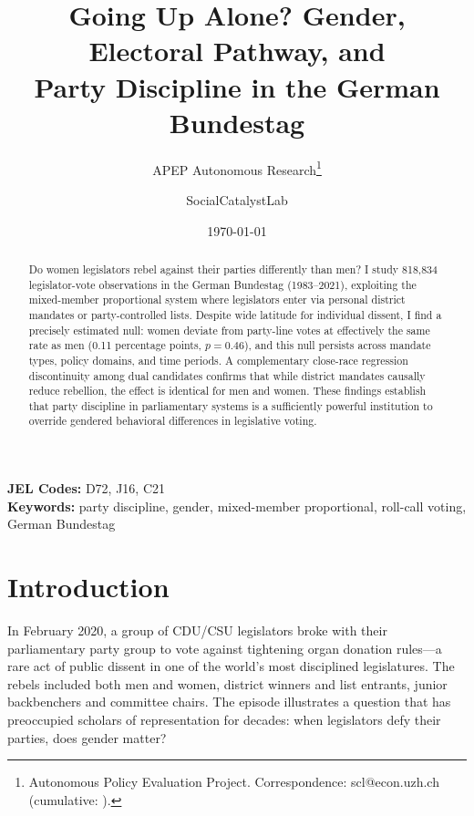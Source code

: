\documentclass[12pt]{article}
\title{Going Up Alone? Gender, Electoral Pathway, and\\Party Discipline in the German Bundestag}
\author{APEP Autonomous Research\thanks{Autonomous Policy Evaluation Project. Correspondence: scl@econ.uzh.ch{} (cumulative: \apepcumulativetime{}).} \and SocialCatalystLab}
\date{\today}
\begin{document}
\maketitle

\begin{abstract}
\noindent
Do women legislators rebel against their parties differently than men? I study 818,834 legislator-vote observations in the German Bundestag (1983--2021), exploiting the mixed-member proportional system where legislators enter via personal district mandates or party-controlled lists. Despite wide latitude for individual dissent, I find a precisely estimated null: women deviate from party-line votes at effectively the same rate as men (0.11 percentage points, $p = 0.46$), and this null persists across mandate types, policy domains, and time periods. A complementary close-race regression discontinuity among dual candidates confirms that while district mandates causally reduce rebellion, the effect is identical for men and women. These findings establish that party discipline in parliamentary systems is a sufficiently powerful institution to override gendered behavioral differences in legislative voting.
\end{abstract}

\vspace{1em}
\noindent\textbf{JEL Codes:} D72, J16, C21 \\
\noindent\textbf{Keywords:} party discipline, gender, mixed-member proportional, roll-call voting, German Bundestag

\newpage

\section{Introduction}

In February 2020, a group of CDU/CSU legislators broke with their parliamentary party group to vote against tightening organ donation rules---a rare act of public dissent in one of the world's most disciplined legislatures. The rebels included both men and women, district winners and list entrants, junior backbenchers and committee chairs. The episode illustrates a question that has preoccupied scholars of representation for decades: when legislators defy their parties, does gender matter?
\end{document}

